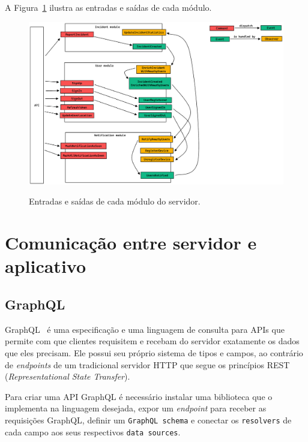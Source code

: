 \FloatBarrier

A Figura~\ref{f.system_server_all_modules_commands-observers-events} ilustra as entradas e saídas de cada módulo.

\begin{figure}[htbp]
	\caption{\small Entradas e saídas de cada módulo do servidor.}
	\centering
	\includegraphics[width=\textwidth]{../diagrams/out/system_server_all_modules_commands-observers-events.png}
	\label{f.system_server_all_modules_commands-observers-events}
\end{figure}

\FloatBarrier

\section{Comunicação entre servidor e aplicativo}

\subsection{GraphQL}

GraphQL~\cite{graphql} é uma especificação e uma linguagem de consulta para APIs que permite com que clientes requisitem e recebam do servidor exatamente os dados que eles precisam. Ele possui seu próprio sistema de tipos e campos, ao contrário de \emph{endpoints} de um tradicional servidor HTTP que segue os princípios REST (\emph{Representational State Transfer}).

Para criar uma API GraphQL é necessário instalar uma biblioteca que o implementa na linguagem desejada, expor um \emph{endpoint} para receber as requisições GraphQL, definir um \texttt{GraphQL schema} e conectar os \texttt{resolvers} de cada campo aos seus respectivos \texttt{data sources}.


